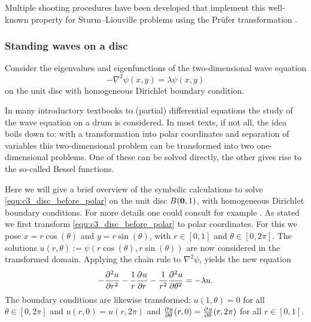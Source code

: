 Multiple shooting procedures \cite{baeyens_fast_2020,ledoux_matslise_2016,ixaru_cp_2000} have been developed that implement this well-known property for Sturm--Liouville problems using the Prüfer transformation \cite{pruefer_neue_1926}.

\subsubsection{Standing waves on a disc}\label{sec:c3_standing_waves_on_disc}

Consider the eigenvalues and eigenfunctions of the two-dimensional wave equation
\begin{equation}\label{equ:c3_disc_before_polar}
  -\nabla^2 \psi(x, y) = \lambda \psi(x, y)
\end{equation}
on the unit disc with homogeneous Dirichlet boundary condition.

In many introductory textbooks to (partial) differential equations the study of the wave equation on a drum is considered. In most texts, if not all, the idea boils down to: with a transformation into polar coordinates and separation of variables this two-dimensional problem can be transformed into two one-dimensional problems. One of these can be solved directly, the other gives rise to the so-called Bessel functions.

Here we will give a brief overview of the symbolic calculations to solve \eqref{equ:c3_disc_before_polar} on the unit disc $B(\vb{0}, 1)$, with homogeneous Dirichlet boundary conditions. For more details one could consult for example \cite[chapter~4]{asmar_partial_2005}. As stated we first transform \eqref{equ:c3_disc_before_polar} to polar coordinates. For this we pose $x = r\cos(\theta)$ and $y = r\sin(\theta)$, with $r \in [0,1]$ and $\theta \in [0, 2\pi]$. The solutions $u(r, \theta) := \psi(r\cos(\theta), r\sin(\theta))$ are now considered in the transformed domain. Applying the chain rule to $\nabla^2\psi$, yields the new equation
\begin{equation}\label{equ:c3_disc_after_polar}
  -{\pdv[2]{u}{r}} - \frac{1}{r}{\pdv[]{u}{r}} - \frac{1}{r^2} {\pdv[2]{u}{\theta}} = - \lambda u\text{.}
\end{equation}
The boundary conditions are likewise transformed: $u(1, \theta) = 0$ for all $\theta \in [0, 2\pi]$ and $u(r, 0) = u(r, 2\pi)$ and ${\pdv[]{u}{\theta}}(r, 0) = {\pdv[]{u}{\theta}}(r, 2\pi)$ for all $r \in [0, 1]$.

